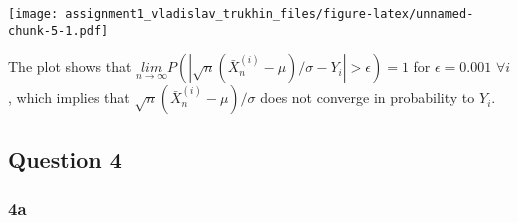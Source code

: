 \documentclass[
]{article}
\begin{document}
\texttt{[image: assignment1\_vladislav\_trukhin\_files/figure-latex/unnamed-chunk-5-1.pdf]}

The plot shows that
\(\underset{n \rightarrow \infty}{lim}P(|\sqrt{n}(\bar{X}_n^{(i)} - \mu)/\sigma - Y_i| > \epsilon) = 1\)
for \(\epsilon = 0.001\) \(\forall i\), which implies that
\(\sqrt{n}(\bar{X}_n^{(i)} - \mu)/\sigma\) does not converge in
probability to \(Y_i\).

\hypertarget{question-4}{%
\subsection{Question 4}\label{question-4}}

\hypertarget{a-2}{%
\subsubsection{4a}\label{a-2}}
\end{document}
